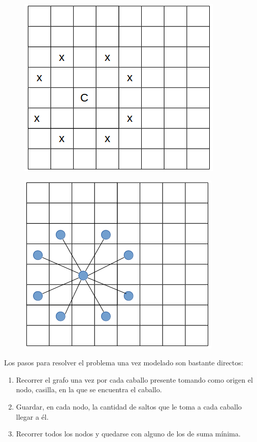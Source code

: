 \begin{figure}[H]
	\begin{minipage}[t]{0.5\linewidth}
		\centering
		\includegraphics[scale=0.5]{show_jumps.png}
		\label{fig:p2_complejidad_varia_k}
	\end{minipage}
	\begin{minipage}[t]{0.5\linewidth}
		\centering
		\includegraphics[scale=0.5]{show_graph.png}
		\label{fig:p2_complejidad_varia_k}
	\end{minipage}
\end{figure}
Los pasos para resolver el problema una vez modelado son bastante directos:
\begin{enumerate}
  \item Recorrer el grafo una vez por cada caballo presente tomando como origen el nodo, casilla, en la 
    que se encuentra el caballo.
  \item Guardar, en cada nodo, la cantidad de saltos que le toma a cada caballo llegar a él.
  \item Recorrer todos los nodos y quedarse con alguno de los de suma mínima.
\end{enumerate}
